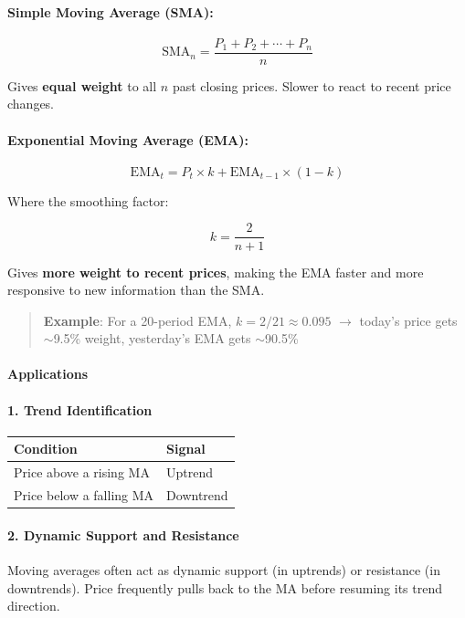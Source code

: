 \documentclass[12pt,openany]{book}
\begin{document}
\paragraph{Simple Moving Average (SMA):}

\[
\text{SMA}_n = \frac{P_1 + P_2 + \cdots + P_n}{n}
\]

Gives \textbf{equal weight} to all \(n\) past closing prices. Slower to react to recent price changes.

\paragraph{Exponential Moving Average (EMA):}

\[
\text{EMA}_t = P_t \times k + \text{EMA}_{t-1} \times (1 - k)
\]

Where the smoothing factor:

\[
k = \frac{2}{n + 1}
\]

Gives \textbf{more weight to recent prices}, making the EMA faster and more responsive to new information than the SMA.

\begin{quote}
\textbf{Example}: For a 20-period EMA, \(k = 2/21 \approx 0.095\) \(\rightarrow\) today's price gets \(\sim\)9.5\% weight, yesterday's EMA gets \(\sim\)90.5\%

\end{quote}
\paragraph{Applications}

\paragraph{1. Trend Identification}

\begin{center}
\small
\renewcommand{\arraystretch}{1.2}
\begin{tabular}{|L{0.30\textwidth}|L{0.60\textwidth}|}
\hline
 \textbf{Condition} & \textbf{Signal} \\ \hline
 Price above a rising MA & Uptrend \\ \hline
 Price below a falling MA & Downtrend \\ \hline
\end{tabular}
\end{center}

\paragraph{2. Dynamic Support and Resistance}
Moving averages often act as dynamic support (in uptrends) or resistance (in downtrends). Price frequently pulls back to the MA before resuming its trend direction.
\end{document}
